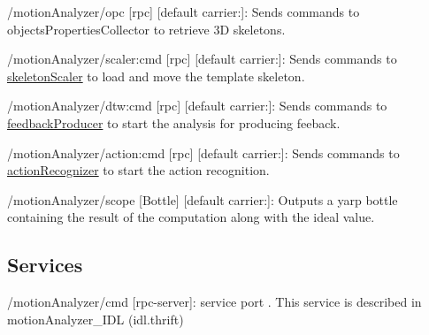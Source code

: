 \begin{DoxyItemize}
\item /motion\+Analyzer/opc \mbox{[}rpc\mbox{]} \mbox{[}default carrier\+:\mbox{]}\+: Sends commands to objects\+Properties\+Collector to retrieve 3D skeletons.
\item /motion\+Analyzer/scaler\+:cmd \mbox{[}rpc\mbox{]} \mbox{[}default carrier\+:\mbox{]}\+: Sends commands to \hyperlink{group__skeletonScaler}{skeleton\+Scaler} to load and move the template skeleton.
\item /motion\+Analyzer/dtw\+:cmd \mbox{[}rpc\mbox{]} \mbox{[}default carrier\+:\mbox{]}\+: Sends commands to \hyperlink{group__feedbackProducer}{feedback\+Producer} to start the analysis for producing feeback.
\item /motion\+Analyzer/action\+:cmd \mbox{[}rpc\mbox{]} \mbox{[}default carrier\+:\mbox{]}\+: Sends commands to \hyperlink{group__actionRecognizer}{action\+Recognizer} to start the action recognition.
\item /motion\+Analyzer/scope \mbox{[}Bottle\mbox{]} \mbox{[}default carrier\+:\mbox{]}\+: Outputs a yarp bottle containing the result of the computation along with the ideal value.
\end{DoxyItemize}\hypertarget{group__skeletonViewer_services_sec}{}\subsection{Services}\label{group__skeletonViewer_services_sec}

\begin{DoxyItemize}
\item /motion\+Analyzer/cmd \mbox{[}rpc-\/server\mbox{]}\+: service port . This service is described in motion\+Analyzer\+\_\+\+I\+DL (idl.\+thrift) 
\end{DoxyItemize}